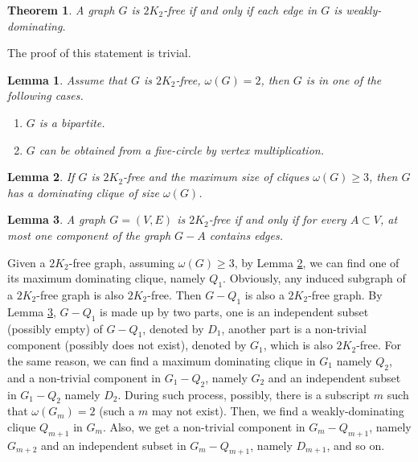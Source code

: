 \documentclass[12pt]{article}
\newtheorem{theorem}{Theorem}
\newtheorem{lemma}{Lemma}
\begin{document}
\begin{theorem}\label{trivial}
A graph $G$ is $2K_2$-free if and only if each edge in $G$ is weakly-dominating.
\end{theorem}
The proof of this statement is trivial.

\begin{lemma}\label{lm1}{\cite[Theorem 2.]{chung1990maximum}\cite[Lemma 2.]{broersma2014toughness}}
Assume that $G$ is $2K_2$-free, $\omega(G)=2$, then $G$ is in one of the following cases.
\begin{enumerate}
\item $G$ is a bipartite.
\item $G$ can be obtained from a five-circle by vertex multiplication.
\end{enumerate}
\end{lemma}



\begin{lemma}\label{lm2}{\cite[Theorem 3.]{chung1990maximum}}
If $G$ is $2K_2$-free and the maximum size of cliques $\omega(G)\ge3$, then $G$ has a dominating clique of size $\omega(G)$.
\end{lemma}

\begin{lemma}\label{lm3}{\cite[Observation 1.]{broersma2014toughness}}
A graph $G=(V,E)$ is $2K_2$-free if and only if for every $A\subset V$, at most one component of the graph $G-A$ contains edges.
\end{lemma}






Given a $2K_2$-free graph, assuming $\omega(G)\ge3$, by Lemma \ref{lm2}, we can find one of its maximum dominating clique, namely $Q_1$. Obviously, any induced subgraph of a $2K_2$-free graph is also $2K_2$-free. Then $G-Q_1$ is also a $2K_2$-free graph. By Lemma \ref{lm3}, $G-Q_1$ is made up by two parts, one is an independent subset (possibly empty) of $G-Q_1$, denoted by $D_1$, another part is a non-trivial component (possibly does not exist), denoted by $G_1$, which is also $2K_2$-free. For the same reason, we can find a maximum dominating clique in $G_1$ namely $Q_2$, and a non-trivial component in $G_1-Q_2$, namely $G_2$ and an independent subset in $G_1-Q_2$ namely $D_2$. During such process, possibly, there is a subscript $m$ such that $\omega(G_m)=2$ (such a $m$ may not exist). Then, we find a weakly-dominating clique $Q_{m+1}$ in $G_m$. Also, we get a non-trivial component in $G_m-Q_{m+1}$, namely $G_{m+2}$ and an independent subset in $G_m-Q_{m+1}$, namely $D_{m+1}$, and so on.
\end{document}
